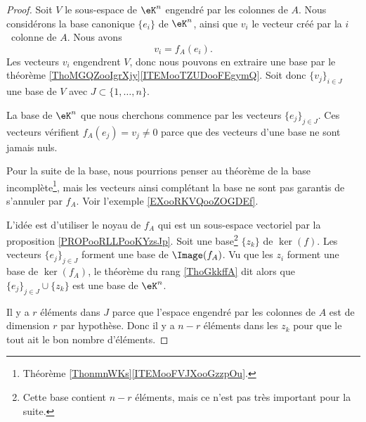 \begin{proof}
	Soit \( V\) le sous-espace de \( \eK^n\) engendré par les colonnes de \( A\). Nous considérons la base canonique \( \{ e_i \}\) de \( \eK^n\), ainsi que \( v_i\) le vecteur créé par la \( i\)\ieme\ colonne de \( A\). Nous avons
	\begin{equation}
		v_i=f_A(e_i).
	\end{equation}
	Les vecteurs \( v_i\) engendrent \( V\), donc nous pouvons en extraire une base par le théorème \ref{ThoMGQZooIgrXjy}\ref{ITEMooTZUDooFEgymQ}. Soit donc \( \{ v_j \}_{i\in J}\) une base de \( V\) avec \( J\subset\{ 1,\ldots, n \}\).

	La base de \( \eK^n\) que nous cherchons commence par les vecteurs \( \{ e_j \}_{j\in J}\). Ces vecteurs vérifient \( f_A(e_j)=v_j\neq 0\) parce que des vecteurs d'une base ne sont jamais nuls.

	Pour la suite de la base, nous pourrions penser au théorème de la base incomplète\footnote{Théorème \ref{ThonmnWKs}\ref{ITEMooFVJXooGzzpOu}.}, mais les vecteurs ainsi complétant la base ne sont pas garantis de s'annuler par \( f_A\). Voir l'exemple \ref{EXooRKVQooZOGDEf}.

	L'idée est d'utiliser le noyau de \( f_A\) qui est un sous-espace vectoriel par la proposition \ref{PROPooRLLPooKYzsJp}. Soit une base\footnote{Cette base contient \( n-r\) éléments, mais ce n'est pas très important pour la suite.} \(  \{ z_k \}  \) de \( \ker(f)\). Les vecteurs \( \{ e_j \}_{j\in J}\) forment une base de \( \Image(f_A)\). Vu que les \( z_i\) forment une base de \( \ker(f_A)\), le théorème du rang \ref{ThoGkkffA} dit alors que \( \{ e_j \}_{j\in J}\cup \{ z_k \}\) est une base de \( \eK^n\).

	Il y a \( r\) éléments dans \( J\) parce que l'espace engendré par les colonnes de \( A\) est de dimension \( r\) par hypothèse. Donc il y a \( n-r\) éléments dans les \( z_k\) pour que le tout ait le bon nombre d'éléments.
\end{proof}

